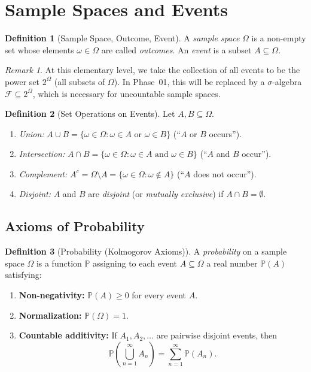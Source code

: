 \documentclass[11pt,a4paper]{article}
\theoremstyle{definition}
\newtheorem{definition}{Definition}[section]
\theoremstyle{plain}
\theoremstyle{remark}
\newtheorem{remark}{Remark}[section]
\newcommand{\Prob}{\mathbb{P}}
\begin{document}
\section{Sample Spaces and Events}
\label{sec:sample_spaces}

\begin{definition}[Sample Space, Outcome, Event]
\label{def:sample_space}
A \emph{sample space} $\Omega$ is a non-empty set whose elements $\omega \in \Omega$ are
called \emph{outcomes}. An \emph{event} is a subset $A \subseteq \Omega$.
\end{definition}

\begin{remark}
At this elementary level, we take the collection of all events to be the power set
$2^\Omega$ (all subsets of $\Omega$). In Phase~01, this will be replaced by a
$\sigma$-algebra $\mathcal{F} \subseteq 2^\Omega$, which is necessary for uncountable
sample spaces.
\end{remark}

\begin{definition}[Set Operations on Events]
\label{def:set_ops}
Let $A, B \subseteq \Omega$.
\begin{enumerate}[nosep]
    \item \emph{Union:} $A \cup B = \{\omega \in \Omega : \omega \in A \text{ or } \omega \in B\}$ (``$A$ or $B$ occurs'').
    \item \emph{Intersection:} $A \cap B = \{\omega \in \Omega : \omega \in A \text{ and } \omega \in B\}$ (``$A$ and $B$ occur'').
    \item \emph{Complement:} $A^c = \Omega \setminus A = \{\omega \in \Omega : \omega \notin A\}$ (``$A$ does not occur'').
    \item \emph{Disjoint:} $A$ and $B$ are \emph{disjoint} (or \emph{mutually exclusive}) if $A \cap B = \emptyset$.
\end{enumerate}
\end{definition}

\subsection{Axioms of Probability}

\begin{definition}[Probability (Kolmogorov Axioms)]
\label{def:probability}
A \emph{probability} on a sample space $\Omega$ is a function $\Prob$ assigning to each
event $A \subseteq \Omega$ a real number $\Prob(A)$ satisfying:
\begin{enumerate}[nosep]
    \item \textbf{Non-negativity:} $\Prob(A) \geq 0$ for every event $A$.
    \item \textbf{Normalization:} $\Prob(\Omega) = 1$.
    \item \textbf{Countable additivity:} If $A_1, A_2, \ldots$ are pairwise disjoint events, then
    \[
        \Prob\!\left(\bigcup_{n=1}^\infty A_n\right) = \sum_{n=1}^\infty \Prob(A_n).
    \]
\end{enumerate}
\end{definition}
\end{document}
